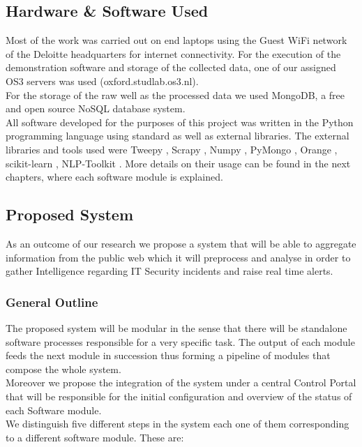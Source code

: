 \documentclass[12pt]{article}
\begin{document}
\subsection{Hardware \& Software Used}


Most of the work was carried out on end laptops using the Guest WiFi network of the Deloitte headquarters for internet connectivity. For the execution of the demonstration software and storage of the collected data, one of our assigned OS3 servers was used (oxford.studlab.os3.nl).\\ 
For the storage of the raw well as the processed data we used MongoDB, a free and open source NoSQL database system.\\ 
All software developed for the purposes of this project was written in the Python programming language using standard as well as external libraries. The external libraries and tools used were Tweepy \cite{tweepy}, Scrapy \cite{scrapy}, Numpy \cite{numpy}, PyMongo \cite{pymongo}, Orange \cite{orange}, scikit-learn \cite{sklearn}, NLP-Toolkit \cite{nltk}. More details on their usage can be found in the next chapters, where each software module is explained.


\subsection{Proposed System}
As an outcome of our research we propose a system that will be able to aggregate information from the public web which it will preprocess and analyse in order to gather Intelligence regarding IT Security incidents and raise real time alerts. 
 
\subsubsection{General Outline}
The proposed system will be modular in the sense that there will be standalone software processes responsible for a very specific task. The output of each module feeds the next module in succession thus forming a pipeline of modules that compose the whole system. \\
Moreover we propose the integration of the system under a central Control Portal that will be responsible for the initial configuration and overview of the status of each Software module.\\
We distinguish five different steps in the system each one of them corresponding to a different software module. These are:
\end{document}

